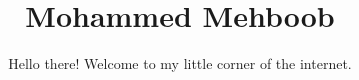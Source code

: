 \documentclass{article}
\title{\textbf{Mohammed Mehboob}}
\author{
Hello there! Welcome to my little corner of the internet.\\
\\
\centering
\fbox{ \hspace*{1cm} Home | Projects | Contact Me \hspace*{1cm} }
}
\date{ }
\begin{document}
\maketitle


\begin{abstract}

\end{abstract}
\end{document}
